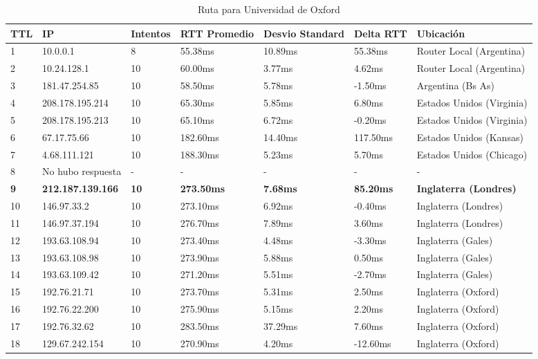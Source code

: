 \begin{table}[H]
	\centering
	\caption{Ruta para Universidad de Oxford}
	\label{table:finlandia}
	\begin{tabular}{|l|l|l|l|l|l|l|}
		\hline
		TTL & IP & Intentos & RTT Promedio & Desvio Standard & Delta RTT & Ubicación \\ \hline 
		1 & 10.0.0.1 & 8 & 55.38ms & 10.89ms & 55.38ms & Router Local (Argentina) \\ \hline 
		2 & 10.24.128.1 & 10 & 60.00ms & 3.77ms & 4.62ms & Router Local (Argentina) \\ \hline 
		3 & 181.47.254.85 & 10 & 58.50ms & 5.78ms & -1.50ms & Argentina (Bs As) \\ \hline 
		4 & 208.178.195.214 & 10 & 65.30ms & 5.85ms & 6.80ms & Estados Unidos (Virginia) \\ \hline 
		5 & 208.178.195.213 & 10 & 65.10ms & 6.72ms & -0.20ms & Estados Unidos (Virginia) \\ \hline 
		6 & 67.17.75.66 & 10 & 182.60ms & 14.40ms & 117.50ms & Estados Unidos (Kansas) \\ \hline 
		7 & 4.68.111.121 & 10 & 188.30ms & 5.23ms & 5.70ms & Estados Unidos (Chicago) \\ \hline 
		8 & No hubo respuesta & - & - & - & - & - \\ \hline 
		\textbf{9} & \textbf{212.187.139.166} & \textbf{10} & \textbf{273.50ms} & \textbf{7.68ms} & \textbf{85.20ms} & \textbf{Inglaterra (Londres)} \\ \hline 
		10 & 146.97.33.2 & 10 & 273.10ms & 6.92ms & -0.40ms & Inglaterra (Londres) \\ \hline 
		11 & 146.97.37.194 & 10 & 276.70ms & 7.89ms & 3.60ms & Inglaterra (Londres) \\ \hline 
		12 & 193.63.108.94 & 10 & 273.40ms & 4.48ms & -3.30ms & Inglaterra (Gales) \\ \hline 
		13 & 193.63.108.98 & 10 & 273.90ms & 5.88ms & 0.50ms & Inglaterra (Gales) \\ \hline 
		14 & 193.63.109.42 & 10 & 271.20ms & 5.51ms & -2.70ms & Inglaterra (Gales) \\ \hline 
		15 & 192.76.21.71 & 10 & 273.70ms & 5.31ms & 2.50ms & Inglaterra (Oxford) \\ \hline 
		16 & 192.76.22.200 & 10 & 275.90ms & 5.15ms & 2.20ms & Inglaterra (Oxford) \\ \hline 
		17 & 192.76.32.62 & 10 & 283.50ms & 37.29ms & 7.60ms & Inglaterra (Oxford) \\ \hline 
		18 & 129.67.242.154 & 10 & 270.90ms & 4.20ms & -12.60ms & Inglaterra (Oxford) \\ \hline
	\end{tabular}
\end{table}

